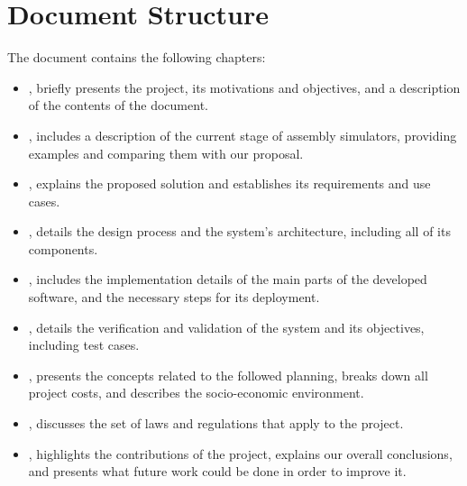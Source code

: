 \section{Document Structure}\label{sec:structure}
The document contains the following chapters:
\begin{itemize}
  \item {}, briefly presents the project, its motivations and objectives, and a description of the contents of the document.
  \item {}, includes a description of the current stage of \gls{assembly} simulators, providing examples and comparing them with our proposal.
  \item {}, explains the proposed solution and establishes its requirements and use cases.
  \item {}, details the design process and the system's architecture, including all of its components.
  \item {}, includes the implementation details of the main parts of the developed software, and the necessary steps for its deployment.
  \item {}, details the verification and validation of the system and its objectives, including test cases.
  \item {}, presents the concepts related to the followed planning, breaks down all project costs, and describes the socio-economic environment.
  \item {}, discusses the set of laws and regulations that apply to the project.
  \item {}, highlights the contributions of the project, explains our overall conclusions, and presents what future work could be done in order to improve it.
\end{itemize}